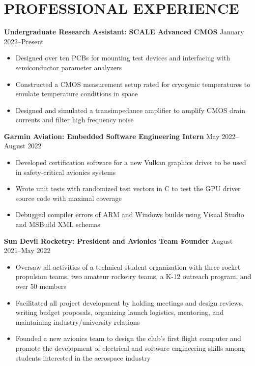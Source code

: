 \documentclass{article}
\begin{document}
\section{PROFESSIONAL EXPERIENCE}
\textbf{Undergraduate Research Assistant: SCALE Advanced CMOS}
\hfill
\vspace{0.5em}
January 2022--Present
\begin{itemize}
\item{Designed over ten PCBs for mounting test devices and interfacing with semiconductor parameter analyzers}
\item{Constructed a CMOS measurement setup rated for cryogenic temperatures to emulate temperature conditions in space}
\item{Designed and simulated a transimpedance amplifier to amplify CMOS drain currents and filter high frequency noise}
\end{itemize}
\vspace{1em}
\textbf{Garmin Aviation: Embedded Software Engineering Intern}
\hfill
\vspace{0.5em}
May 2022--August 2022
\begin{itemize}
\item{Developed certification software for a new Vulkan graphics driver to be used in safety-critical avionics systems}
\item{Wrote unit tests with randomized test vectors in C to test the GPU driver source code with maximal coverage}
\item{Debugged compiler errors of ARM and Windows builds using Visual Studio and MSBuild XML schemas}
\end{itemize}
\vspace{1em}
\textbf{Sun Devil Rocketry: President and Avionics Team Founder}
\hfill
\vspace{0.5em}
August 2021--May 2022
\begin{itemize}
\item{Oversaw all activities of a technical student organization with three rocket propulsion teams, two amateur rocketry teams, a K-12 outreach program, and over 50 members   }
\item{Facilitated all project development by holding meetings and design reviews, writing budget proposals, organizing launch logistics, mentoring, and maintaining industry/university relations}
\item{Founded a new avionics team to design the club's first flight computer and promote the development of electrical and software engineering skills among students interested in the aerospace industry}
\vspace{1em}
\end{itemize}
\end{document}
